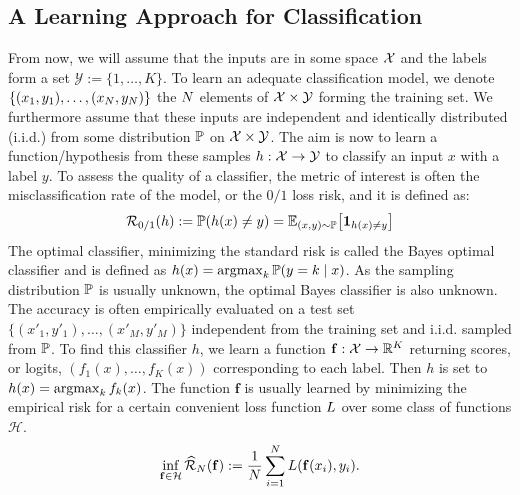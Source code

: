 \subsection{A Learning Approach for Classification}
From now, we will assume that the inputs are in some space $\mathcal{X}$ and the labels form a set $\mathcal{Y}:=\{1,\dots,K\}$. To learn an adequate classification model, we denote $\{(x_1,y_1),\dots,(x_N,y_N)\}$ the $N$ elements of $\mathcal{X}\times\mathcal{Y}$ forming the training set. We furthermore assume that these inputs are independent and identically distributed (i.i.d.) from some distribution $\mathbb{P}$ on $\mathcal{X}\times\mathcal{Y}$. The aim is now to learn a function/hypothesis from these samples $h:\mathcal{X}\to\mathcal{Y}$ to classify an input $x$ with a label $y$. To assess the quality of a classifier, the metric of interest is often the misclassification rate of the model, or the $0/1$ loss risk, and it is defined as:
\begin{align*}
\risk_{0/1}(h):=\PP(h(x)\neq y) = \EE_{(x,y)\sim\PP}\left[\mathbf{1}_{h(x)\neq y}\right]
\end{align*}
The optimal classifier, minimizing the standard risk is called the Bayes optimal classifier and is defined as $h(x) = \operatorname*{argmax}_k\mathbb{P}(y=k\mid x)$.
As the sampling distribution $\mathbb{P}$ is usually unknown, the optimal Bayes classifier is also unknown. The accuracy is often empirically evaluated on a test set $\{(x'_1,y'_1),\dots,(x'_M,y'_M)\}$ independent from the training set and i.i.d. sampled from $\mathbb{P}$.  To find this classifier $h$, we learn a function $\mathbf{f}:\mathcal{X}\to\mathbb{R}^K$ returning scores, or logits, $(f_1(x),\dots,f_K(x))$ corresponding to each label. Then $h$ is set to $h(x)=\operatorname*{argmax}_k f_k(x)$. The function $\mathbf{f}$ is usually learned by minimizing the empirical risk for a certain convenient loss function $L$ over some class of functions $\mathcal{H}$.
\begin{align*}
\inf_{\mathbf{f}\in\mathcal{H}}\widehat{\mathcal{R}}_{N}(\mathbf{f}):= \frac{1}{N}\sum_{i=1}^N L(\mathbf{f}(x_i),y_i).
\end{align*}

